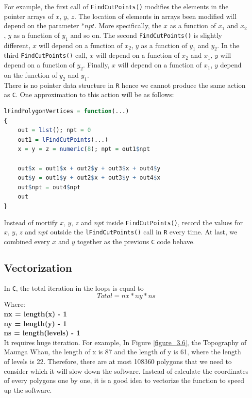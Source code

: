 \documentclass[paper=a4, fontsize=11pt]{report}
\begin{document}
For example, the first call of \texttt{FindCutPoints()} modifies the elements in the pointer arrays of $x$, $y$, $z$. The location of elements in arrays been modified will depend on the parameter $*npt$. More specifically, the $x$ as a function of $x_1$ and $x_2$, $y$ as a function of $y_1$ and so on. The second \texttt{FindCutPoints()} is slightly different, $x$ will depend on a function of $x_2$, $y$ as a function of $y_1$ and $y_2$. In the third \texttt{FindCutPoints()} call, $x$ will depend on a function of $x_2$ and $x_1$, $y$ will depend on a function of $y_2$. Finally, $x$ will depend on a function of $x_1$, $y$ depend on the function of $y_2$ and $y_1$. \\

There is no pointer data structure in \texttt{R} hence we cannot produce the same action as \texttt{C}. One approximation to this action will be as follows:
\begin{lstlisting}[language = R]
lFindPolygonVertices = function(...)
{
    out = list(); npt = 0
    out1 = lFindCutPoints(...)
    x = y = z = numeric(8); npt = out1$npt

    out$x = out1$x + out2$y + out3$x + out4$y
    out$y = out1$y + out2$x + out3$y + out4$x
    out$npt = out4$npt
    out
}
\end{lstlisting}
Instead of mortify $x$, $y$, $z$ and $npt$ inside \texttt{FindCutPoints()}, record the values for $x$, $y$, $z$ and $npt$ outside the \texttt{lFindCutPoints()} call in \texttt{R} every time. At last, we combined every $x$ and $y$ together as the previous \texttt{C} code behave. 


\subsection{Vectorization}
In \texttt{C}, the total iteration in the loops is equal to
\begin{equation}
Total = nx * ny * ns
\end{equation}
Where:\\
\textbf{nx = length(x) - 1}\\
\textbf{ny = length(y) - 1}\\
\textbf{ns = length(levels) - 1}\\

It requires huge iteration. For example, In Figure \ref{figure_3.6}, the Topography of Maunga Whau, the length of x is 87 and the length of y is 61, where the length of levels is 22. Therefore, there are at most 108360 polygons that we need to consider which it will slow down the software. Instead of calculate the coordinates of every polygons one by one, it is a good idea to vectorize the function to speed up the software.
\end{document}
